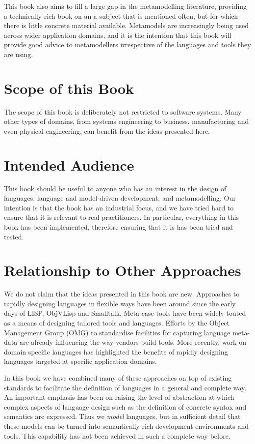 This book also aims to fill a large gap in the metamodelling
literature, providing a technically rich book on an a subject that
is mentioned often, but for which there is little concrete
material available. Metamodels are increasingly being used across
wider application domains, and it is the intention that this book
will provide good advice to metamodellers irrespective of the
languages and tools they are using.

\section*{Scope of this Book}

The scope of this book is deliberately not restricted to software
systems. Many other types of domains, from systems engineering to
business, manufacturing and even physical engineering, can benefit
from the ideas presented here.

\section*{Intended Audience}

This book should be useful to anyone who has an interest in the
design of languages, language and model-driven development, and
metamodelling. Our intention is that the book has an industrial
focus, and we have tried hard to ensure that it is relevant to
real practitioners. In particular, everything in this book has
been implemented, therefore ensuring that it is has been tried and
tested.

\section*{Relationship to Other Approaches}

We do not claim that the ideas presented in this book are new.
Approaches to rapidly designing languages in flexible ways have
been around since the early days of LISP, ObjVLisp and Smalltalk.
Meta-case tools have been widely touted as a means of designing
tailored tools and languages. Efforts by the Object Management
Group (OMG) to standardise facilities for capturing language
meta-data are already influencing the way vendors build tools.
More recently, work on domain specific languages has highlighted
the benefits of rapidly designing languages targeted at specific
application domains.

In this book we have combined many of these approaches on top of
existing standards to facilitate the definition of languages in a
general and complete way. An important emphasis has been on
raising the level of abstraction at which complex aspects of
language design such as the definition of concrete syntax and
semantics are expressed. Thus we {\em model} languages, but in
sufficient detail that these models can be turned into
semantically rich development environments and tools. This
capability has not been achieved in such a complete way before.

